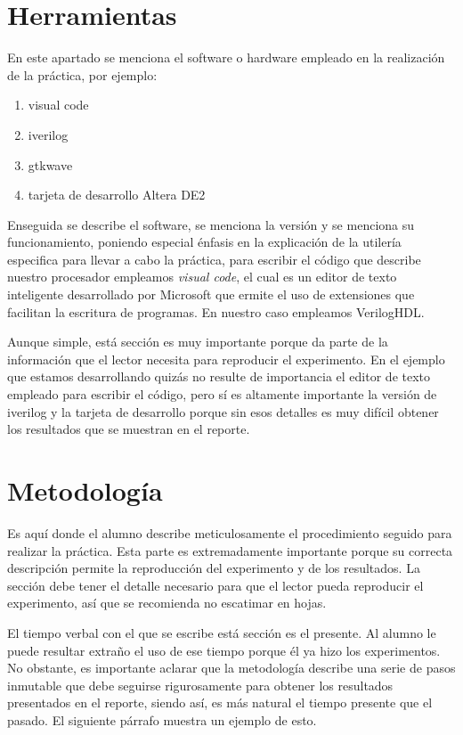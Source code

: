 \documentclass[12pt]{article}
\begin{document}

\section{Herramientas}\label{sec:tools}

En este apartado se menciona el software o hardware empleado en la realización 
de la práctica, por ejemplo:
\begin{enumerate}
  \item visual code
  \item iverilog
  \item gtkwave
  \item tarjeta de desarrollo Altera DE2
\end{enumerate}

Enseguida se describe el software, se menciona la versión y se menciona su 
funcionamiento, poniendo especial énfasis en la explicación de la utilería 
especifica para llevar a cabo la práctica, \eg para escribir el código que 
describe nuestro procesador empleamos \textit{visual code}, el cual es un editor 
de texto inteligente desarrollado por Microsoft que ermite el uso de extensiones 
que facilitan la escritura de programas. En nuestro caso empleamos VerilogHDL.

Aunque simple, está sección es muy importante porque da parte de la información 
que el lector necesita para reproducir el experimento. En el ejemplo que estamos 
desarrollando quizás no resulte de importancia el editor de texto empleado para 
escribir el código, pero sí es altamente importante la versión de iverilog y la 
tarjeta de desarrollo porque sin esos detalles es muy difícil obtener los 
resultados que se muestran en el reporte.

\section{Metodología}\label{sec:methodology}

Es aquí donde el alumno describe meticulosamente el procedimiento seguido para 
realizar la práctica. Esta parte es extremadamente importante porque su correcta 
descripción permite la reproducción del experimento y de los resultados. La 
sección debe tener el detalle necesario para que el lector pueda reproducir el 
experimento, así que se recomienda no escatimar en hojas.

El tiempo verbal con el que se escribe está sección es el presente. Al alumno 
le puede resultar extraño el uso de ese tiempo porque él ya hizo los 
experimentos. No obstante, es importante aclarar que la metodología describe 
una serie de pasos inmutable que debe seguirse rigurosamente para obtener los 
resultados presentados en el reporte, siendo así, es más natural el tiempo 
presente que el pasado. El siguiente párrafo muestra un ejemplo de esto.
\end{document}
